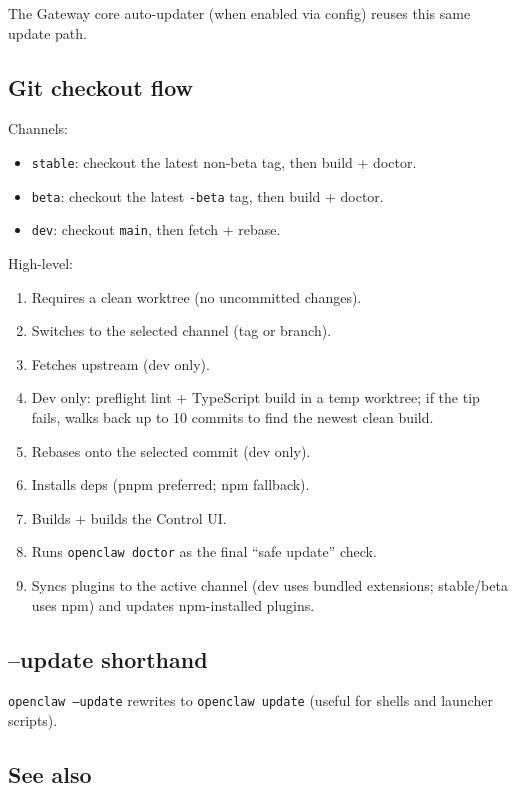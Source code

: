 The Gateway core auto-updater (when enabled via config) reuses this same update path.

\subsection{Git checkout flow}


Channels:

\begin{itemize}
  \item \texttt{stable}: checkout the latest non-beta tag, then build + doctor.
  \item \texttt{beta}: checkout the latest \texttt{-beta} tag, then build + doctor.
  \item \texttt{dev}: checkout \texttt{main}, then fetch + rebase.
\end{itemize}


High-level:

\begin{enumerate}
  \item Requires a clean worktree (no uncommitted changes).
  \item Switches to the selected channel (tag or branch).
  \item Fetches upstream (dev only).
  \item Dev only: preflight lint + TypeScript build in a temp worktree; if the tip fails, walks back up to 10 commits to find the newest clean build.
  \item Rebases onto the selected commit (dev only).
  \item Installs deps (pnpm preferred; npm fallback).
  \item Builds + builds the Control UI.
  \item Runs \texttt{openclaw doctor} as the final “safe update” check.
  \item Syncs plugins to the active channel (dev uses bundled extensions; stable/beta uses npm) and updates npm-installed plugins.
\end{enumerate}


\subsection{--update shorthand}


\texttt{openclaw --update} rewrites to \texttt{openclaw update} (useful for shells and launcher scripts).

\subsection{See also}


